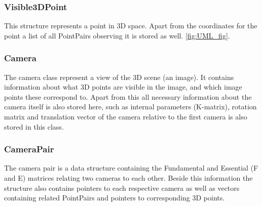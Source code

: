 \subsubsection{Visible3DPoint}
This structure represents a point in 3D space. Apart from the coordinates for the point a list of all PointPairs observing it is stored as well.  \ref{fig:UML_fig}. %

\subsubsection{Camera}
The camera class represent a view of the 3D scene (an image). It contains information about what 3D points are visible in the image, and which image points these correspond to. Apart from this all necessary information about the camera itself is also stored here, such as internal parameters (K-matrix), rotation matrix and translation vector of the camera relative to the first camera is also stored in this class.

\subsubsection{CameraPair}
The camera pair is a data structure containing the Fundamental and Essential (F and E) matrices relating two cameras to each other. Beside this information the structure also contains pointers to each respective camera as well as vectors containing related PointPairs and pointers to corresponding 3D points.

